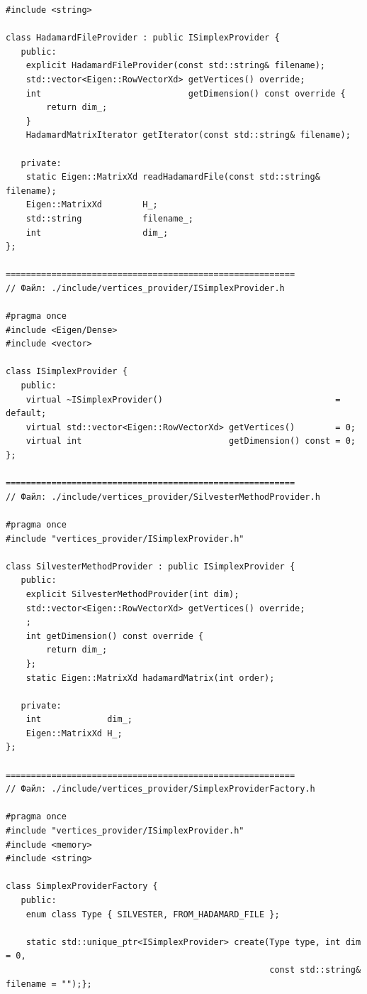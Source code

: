 \documentclass[a4paper,12pt]{article}
\begin{document}
\begin{lstlisting}
#include <string>

class HadamardFileProvider : public ISimplexProvider {
   public:
    explicit HadamardFileProvider(const std::string& filename);
    std::vector<Eigen::RowVectorXd> getVertices() override;
    int                             getDimension() const override {
        return dim_;
    }
    HadamardMatrixIterator getIterator(const std::string& filename);

   private:
    static Eigen::MatrixXd readHadamardFile(const std::string& filename);
    Eigen::MatrixXd        H_;
    std::string            filename_;
    int                    dim_;
};

=========================================================
// Файл: ./include/vertices_provider/ISimplexProvider.h

#pragma once
#include <Eigen/Dense>
#include <vector>

class ISimplexProvider {
   public:
    virtual ~ISimplexProvider()                                  = default;
    virtual std::vector<Eigen::RowVectorXd> getVertices()        = 0;
    virtual int                             getDimension() const = 0;
};

=========================================================
// Файл: ./include/vertices_provider/SilvesterMethodProvider.h

#pragma once
#include "vertices_provider/ISimplexProvider.h"

class SilvesterMethodProvider : public ISimplexProvider {
   public:
    explicit SilvesterMethodProvider(int dim);
    std::vector<Eigen::RowVectorXd> getVertices() override;
    ;
    int getDimension() const override {
        return dim_;
    };
    static Eigen::MatrixXd hadamardMatrix(int order);

   private:
    int             dim_;
    Eigen::MatrixXd H_;
};

=========================================================
// Файл: ./include/vertices_provider/SimplexProviderFactory.h

#pragma once
#include "vertices_provider/ISimplexProvider.h"
#include <memory>
#include <string>

class SimplexProviderFactory {
   public:
    enum class Type { SILVESTER, FROM_HADAMARD_FILE };

    static std::unique_ptr<ISimplexProvider> create(Type type, int dim = 0,
                                                    const std::string& filename = "");};
\end{lstlisting}
\end{document}
